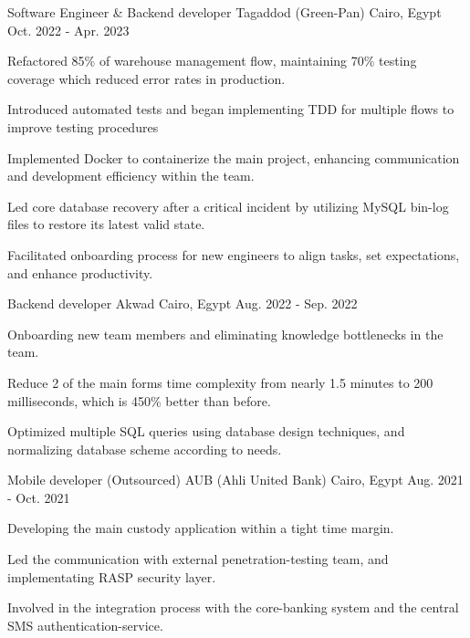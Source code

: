 \begin{cventries}
  \cventry
    {Software Engineer \& Backend developer} %
    {Tagaddod (Green-Pan)} %
    {Cairo, Egypt} %
    {Oct. 2022 - Apr. 2023} %
    {
      \begin{cvitems} %
        \item {Refactored 85\% of warehouse management flow, maintaining 70\% testing coverage which reduced error rates in production.}
        \item {Introduced automated tests and began implementing TDD for multiple flows to improve testing procedures}
        \item {Implemented Docker to containerize the main project, enhancing communication and development efficiency within the team.}
        \item {Led core database recovery after a critical incident by utilizing MySQL bin-log files to restore its latest valid state.
              }
        \item {Facilitated onboarding process for new engineers to align tasks, set expectations, and enhance productivity.}
      \end{cvitems}
    }

  \cventry
    {Backend developer} %
    {Akwad} %
    {Cairo, Egypt} %
    {Aug. 2022 - Sep. 2022} %
    {
      \begin{cvitems} %
        \item {Onboarding new team members and eliminating knowledge bottlenecks in the team.}
        \item {Reduce 2 of the main forms time complexity from nearly 1.5 minutes to 200 milliseconds, which is 450\% better than before.}
        \item {Optimized multiple SQL queries using database design techniques, and normalizing database scheme according to needs.}
      \end{cvitems}
    }

  \cventry
    {Mobile developer (Outsourced)} %
    {AUB (Ahli United Bank)} %
    {Cairo, Egypt} %
    {Aug. 2021 - Oct. 2021} %
    {
      \begin{cvitems} %
        \item {Developing the main custody application within a tight time margin.}
        \item {Led the communication with external penetration-testing team, and implementating RASP security layer.}
        \item {Involved in the integration process with the core-banking system and the central SMS authentication-service.}
      \end{cvitems}
    }


\end{cventries}

